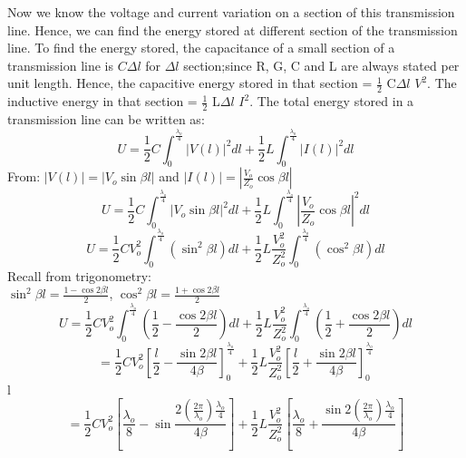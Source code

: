 Now we know the voltage and current variation on a section of this transmission line. Hence, we can find the energy stored at different section of the transmission line. To find the energy stored, the capacitance of a small section of a transmission line is $C\Delta l$ for $\Delta l$ section;since R, G, C and L are always stated per unit length. Hence, the capacitive energy stored in that section = $\frac{1}{2}$ C$\Delta $$l$ $ V^{2}$. The inductive energy in that section =  $\frac{1}{2}$ L$\Delta $$l$ $ I^{2}$. The total energy stored in a transmission line can be written as:
\begin{equation}
U = \frac{1}{2}C\int_{0}^{\frac{\lambda_{o}}{4}}|V(l)|^{2}dl + \frac{1}{2}L\int_{0}^{\frac{\lambda_{o}}{4}}|I(l)|^{2}dl
\end{equation}
From: $ | V(l) | = |V_{o}\sin \beta l | $ and $  | I(l) | = \left|\frac{V_{o}}{Z_{o}}\cos \beta l\right |$
\begin{equation}
U = \frac{1}{2}C\int_{0}^{\frac{\lambda_{o}}{4}}|V_{o}\sin \beta l |^{2}dl + \frac{1}{2}L\int_{0}^{\frac{\lambda_{o}}{4}}\left|\frac{V_{o}}{Z_{o}}\cos \beta l \right|^{2}dl
\end{equation}
\begin{equation}
U = \frac{1}{2}CV_{o}^{2}\int_{0}^{\frac{\lambda_{o}}{4}}(\sin^{2} \beta l) dl + \frac{1}{2}L\frac{V_{o}^{2}}{Z_{o}^{2}}\int_{0}^{\frac{\lambda_{o}}{4}}( \cos^{2} \beta l) dl    
\end{equation}
Recall from trigonometry:\\       
$\sin^{2} \beta l = \frac{1 - \cos2\beta l}{2}$, $\cos^{2} \beta l = \frac{1 + \cos2\beta l}{2}$
{\small \begin{equation}
 U = \frac{1}{2}CV_{o}^{2}\int_{0}^{\frac{\lambda_{o}}{4}}\left(\frac{1}{2} - \frac{\cos 2\beta l}{2}\right) dl + \frac{1}{2}L\frac{V_{o}^{2}}{Z_{o}^{2}}\int_{0}^{\frac{\lambda_{o}}{4}} \left
(\frac{1}{2} + \frac{\cos 2\beta l}{2}\right) dl    
\end{equation}}
\begin{equation}
= \frac{1}{2}CV_{o}^{2}\left[\frac{l}{2} - \frac{\sin 2\beta l}{4 \beta}\right]_{0}^{\frac{\lambda_{o}}{4}}  + \frac{1}{2}L\frac{V_{o}^{2}}{Z_{o}^{2}}\left[\frac{l}{2} + \frac{\sin 2\beta l}{4 \beta}\right]_{0}^{\frac{\lambda_{o}}{4}}
\end{equation}
{\smal
l\begin{equation}
= \frac{1}{2}CV_{o}^{2}\left[\frac{\lambda_{o}}{8} - \sin \frac{2(\frac{2\pi}{\lambda_{o}})\frac{\lambda_{o}}{4} }{4 \beta}\right] + \frac{1}{2}L\frac{V_{o}^{2}}{Z_{o}^{2}}\left[\frac{\lambda_{o}}{8} + \frac{\sin 2(\frac{2\pi}{\lambda_{o}})\frac{\lambda_{o}}{4} }{4 \beta}\right]
\end{equation}}
